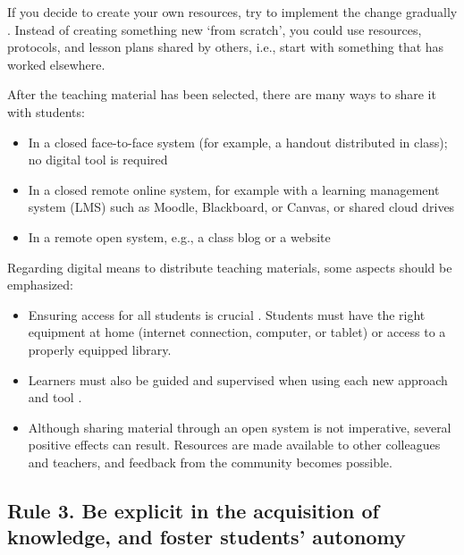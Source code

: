 \documentclass[10pt,letterpaper]{article}
\begin{document}
If you decide to create your own resources, try to implement the change gradually \cite{lo_critical_2017}. 
Instead of creating something new ‘from scratch’, you could use resources, protocols, and lesson plans 
shared by others, i.e., start with something that has worked elsewhere.

After the teaching material has been selected, there are many ways to share it with students:

\begin{itemize}

\item In a closed face-to-face system (for example, a handout distributed in class); no digital tool is required

\item In a closed remote online system, for example with a learning management system (LMS) such as Moodle, Blackboard, or Canvas, 
or shared cloud drives

\item In a remote open system, e.g., a class blog or a website

\end{itemize}

Regarding digital means to distribute teaching materials, some aspects should be emphasized:

\begin{itemize}

\item Ensuring access for all students is crucial \cite{lo_critical_2017}. 
Students must have the right equipment at home (internet connection, computer, or tablet) 
or access to a properly equipped library.

\item Learners must also be guided and supervised when using each new approach and tool \cite{lo_critical_2017}.

\item Although sharing material through an open system is not imperative, several positive effects can result. 
Resources are made available to other colleagues and teachers, and feedback from the community becomes possible.

\end{itemize}

\subsection{Rule 3. Be explicit in the acquisition of knowledge, and foster students' autonomy}
\end{document}
